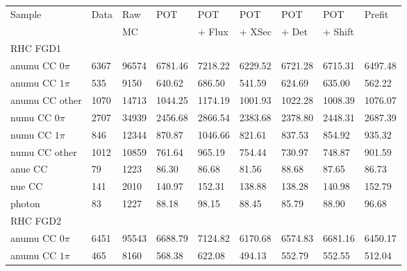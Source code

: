 \begin{table}[ht]
  \begin{adjustbox}{center}
    \tabcolsep=0.11cm

    \begin{tabular}{lllllllll}
      \toprule
      \multirow{2}{*}{Sample} & \multirow{2}{*}{Data} & Raw      & \multirow{2}{*}{\Gls{POT}} & \Gls{POT} & \Gls{POT} & \Gls{POT} & \Gls{POT} & \multirow{2}{*}{Prefit} \\
                              &                       & \Gls{MC} &                            & + Flux    & + XSec    & + Det     & + Shift   &  \\
      \midrule
      \multicolumn{9}{l}{\Gls{RHC} \Gls{FGD}1}              \\
      \midrule
      \Gls{anumu} \Gls{CC} $0\pi$    &  6367 &  96574 &  6781.46 &  7218.22 &  6229.52 &  6721.28 & 6715.31 & 6497.48\\
      \Gls{anumu} \Gls{CC} $1\pi$    &  535  &  9150  &  640.62  &  686.50  &  541.59  &  624.69  & 635.00  & 562.22 \\
      \Gls{anumu} \Gls{CC} other     &  1070 &  14713 &  1044.25 &  1174.19 &  1001.93 &  1022.28 & 1008.39 & 1076.07\\
      \Gls{numu}  \Gls{CC} $0\pi$    &  2707 &  34939 &  2456.68 &  2866.54 &  2383.68 &  2378.80 & 2448.31 & 2687.39\\
      \Gls{numu}  \Gls{CC} $1\pi$    &  846  &  12344 &  870.87  &  1046.66 &  821.61  &  837.53  & 854.92  & 935.32 \\
      \Gls{numu}  \Gls{CC} other     &  1012 &  10859 &  761.64  &  965.19  &  754.44  &  730.97  & 748.87  & 901.59 \\
      \Gls{anue}  \Gls{CC}           &  79   &  1223  &  86.30   &  86.68   &  81.56   &  88.68   & 87.65   & 86.73  \\
      \Gls{nue}   \Gls{CC}           &  141  &  2010  &  140.97  &  152.31  &  138.88  &  138.28  & 140.98  & 152.79 \\
      photon                         &  83   &  1227  &  88.18   &  98.15   &  88.45   &  85.79   & 88.90   & 96.68  \\
      \midrule
      \multicolumn{9}{l}{\Gls{RHC} \Gls{FGD}2}              \\
      \midrule
      \Gls{anumu} \Gls{CC} $0\pi$    &  6451 & 95543 & 6688.79 &  7124.82 &  6170.68 &  6574.83 & 6681.16 & 6450.17\\
      \Gls{anumu} \Gls{CC} $1\pi$    &  465  & 8160  & 568.38  &  622.08  &  494.13  &  552.79  & 552.55  & 512.04 \\

\end{tabular}
\end{adjustbox}
\end{table}
